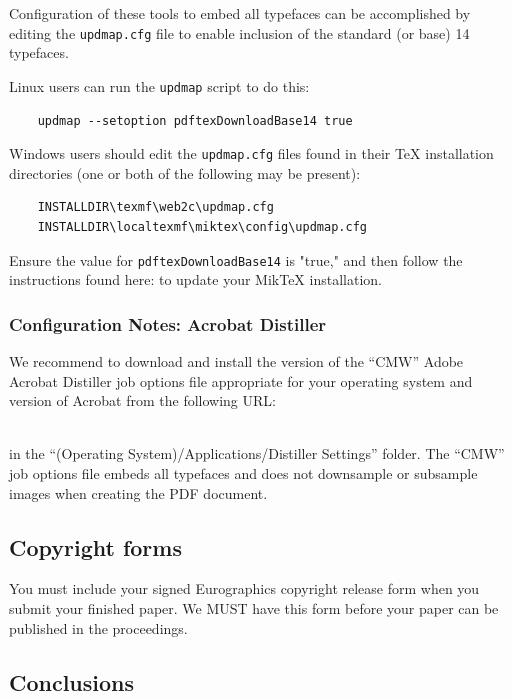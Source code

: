 \documentclass{egpubl}
\begin{document}
	\noindent
	Configuration of these tools to embed all typefaces can be accomplished by editing the \texttt{updmap.cfg} file
	to enable inclusion of the standard (or base) 14 typefaces.
	
	Linux users can run the \texttt{updmap} script to do this:
	\begin{verbatim}
	updmap --setoption pdftexDownloadBase14 true
	\end{verbatim}
	
	Windows users should edit the \texttt{updmap.cfg} files found in their TeX installation directories (one or both
	of the following may be present):
	\begin{verbatim}
	INSTALLDIR\texmf\web2c\updmap.cfg
	INSTALLDIR\localtexmf\miktex\config\updmap.cfg
	\end{verbatim}
	
	Ensure the value for \texttt{pdftexDownloadBase14} is "true," and then follow the instructions found here:
	 to update your MikTeX installation.
	
	\subsubsection*{Configuration Notes: Acrobat Distiller}
	
	We recommend to download and install the version of the ``CMW'' Adobe Acrobat Distiller job options file
	appropriate for your operating system and version of Acrobat from the following URL:
	
	\\
	in the ``(Operating System)/Applications/Distiller Settings'' folder. The ``CMW'' job options file embeds
	all typefaces and does not downsample or subsample images when creating the PDF document.
	\subsection{Copyright forms}
	
	You must include your signed Eurographics copyright release form
	when you submit your finished paper. We MUST have this form before
	your paper can be published in the proceedings.
	
	\subsection{Conclusions}
	
\end{document}
